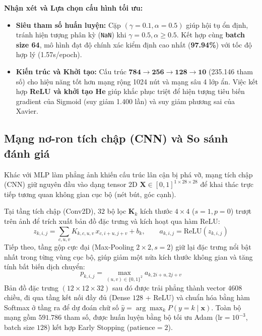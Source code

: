 \documentclass[11pt,a4paper]{article}
\begin{document}
\noindent
\textbf{Nhận xét và Lựa chọn cấu hình tối ưu:}
\begin{itemize}[noitemsep]
    \item \textbf{Siêu tham số huấn luyện:} Cặp $(\gamma = 0.1, \alpha = 0.5)$ giúp hội tụ ổn định, tránh hiện tượng phân kỳ (\texttt{NaN}) khi $\gamma = 0.5, \alpha \ge 0.5$. Kết hợp cùng \textbf{batch size 64}, mô hình đạt độ chính xác kiểm định cao nhất (\textbf{97.94\%}) với tốc độ hợp lý (1.57s/epoch).
    \item \textbf{Kiến trúc và Khởi tạo:} Cấu trúc $\mathbf{784 \to 256 \to 128 \to 10}$ (235.146 tham số) cho hiệu năng tốt hơn mạng rộng 1024 nút và mạng sâu 4 lớp ẩn. Việc kết hợp \textbf{ReLU và khởi tạo He} giúp khắc phục triệt để hiện tượng tiêu biến gradient của Sigmoid (suy giảm 1.400 lần) và suy giảm phương sai của Xavier.
\end{itemize}
\subsection{Mạng nơ-ron tích chập (CNN) và So sánh đánh giá}

Khác với MLP làm phẳng ảnh khiến cấu trúc lân cận bị phá vỡ, mạng tích chập (CNN) giữ nguyên đầu vào dạng tensor 2D $\mathbf{X} \in [0, 1]^{1 \times 28 \times 28}$ để khai thác trực tiếp tương quan không gian cục bộ (nét bút, góc cạnh).

Tại tầng tích chập (Conv2D), $32$ bộ lọc $\mathbf{K}_k$ kích thước $4 \times 4$ ($s = 1, p = 0$) trượt trên ảnh để trích xuất bản đồ đặc trưng và kích hoạt qua hàm ReLU:
\begin{equation}
    z_{k,i,j} = \sum_{c,u,v} K_{k,c,u,v} \, x_{c, i+u, j+v} + b_k, \qquad a_{k,i,j} = \text{ReLU}(z_{k,i,j})
\end{equation}
Tiếp theo, tầng gộp cực đại (Max-Pooling $2 \times 2, s = 2$) giữ lại đặc trưng nổi bật nhất trong từng vùng cục bộ, giúp giảm một nửa kích thước không gian và tăng tính bất biến dịch chuyển:
\begin{equation}
    p_{k,i,j} = \max_{(u,v) \in \{0,1\}^2} a_{k, 2i+u, 2j+v}
\end{equation}
Bản đồ đặc trưng $(12 \times 12 \times 32)$ sau đó được trải phẳng thành vector $4608$ chiều, đi qua tầng kết nối đầy đủ (Dense $128$ + ReLU) và chuẩn hóa bằng hàm Softmax ở tầng ra để dự đoán chữ số $\hat{y} = \arg\max_k P(y = k \mid \mathbf{x})$. Toàn bộ mạng gồm $591.786$ tham số, được huấn luyện bằng bộ tối ưu Adam ($\text{lr} = 10^{-3}$, batch size $128$) kết hợp Early Stopping ($\text{patience} = 2$).
\end{document}
